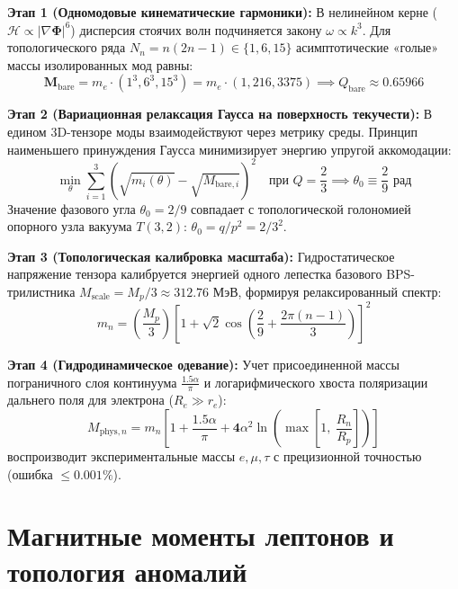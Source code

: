 \documentclass[12pt,a4paper]{article}
\begin{document}
\textbf{Этап 1 (Одномодовые кинематические гармоники):}
В нелинейном керне ($\mathcal{H} \propto |\nabla\boldsymbol{\Phi}|^6$) дисперсия стоячих волн подчиняется закону $\omega \propto k^3$. Для топологического ряда $N_n = n(2n-1) \in \{1, 6, 15\}$ асимптотические «голые» массы изолированных мод равны:
\begin{equation}
	\mathbf{M}_{\mathrm{bare}} = m_e \cdot (1^3, 6^3, 15^3) = m_e \cdot (1, 216, 3375) \implies Q_{\mathrm{bare}} \approx 0.65966
\end{equation}

\textbf{Этап 2 (Вариационная релаксация Гаусса на поверхность текучести):}
В едином 3D-тензоре моды взаимодействуют через метрику среды. Принцип наименьшего принуждения Гаусса минимизирует энергию упругой аккомодации:
\begin{equation}
	\min_{\theta} \sum_{i=1}^3 \left( \sqrt{m_i(\theta)} - \sqrt{M_{\mathrm{bare}, i}} \right)^2 \quad \text{при } Q = \frac{2}{3} \implies \theta_0 \equiv \frac{2}{9} \text{ рад}
\end{equation}
Значение фазового угла $\theta_0 = 2/9$ совпадает с топологической голономией опорного узла вакуума $T(3,2)$: $\theta_0 = q/p^2 = 2/3^2$.

\textbf{Этап 3 (Топологическая калибровка масштаба):}
Гидростатическое напряжение тензора калибруется энергией одного лепестка базового BPS-трилистника $M_{\mathrm{scale}} = M_p / 3 \approx 312.76$ МэВ, формируя релаксированный спектр:
\begin{equation}
	m_n = \left(\frac{M_p}{3}\right) \left[ 1 + \sqrt{2} \cos\left( \frac{2}{9} + \frac{2\pi(n-1)}{3} \right) \right]^2
\end{equation}

\textbf{Этап 4 (Гидродинамическое одевание):}
Учет присоединенной массы пограничного слоя континуума $\frac{1.5\alpha}{\pi}$ и логарифмического хвоста поляризации дальнего поля для электрона ($R_e \gg r_e$):
\begin{equation}
	M_{\mathrm{phys}, n} = m_n \left[ 1 + \frac{1.5\alpha}{\pi} + \mathbf{4} \alpha^2 \ln\left( \max\left[ 1, \ \frac{R_n}{R_p} \right] \right) \right]
\end{equation}
воспроизводит экспериментальные массы $e, \mu, \tau$ с прецизионной точностью (ошибка $\le 0.001\%$).

\section{Магнитные моменты лептонов и топология аномалий}
\end{document}
